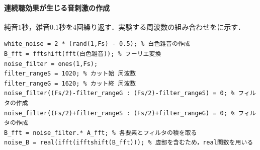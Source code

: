 \paragraph{連続聴効果が生じる音刺激の作成}純音\(1\)秒，雑音\(0.1\)秒を4回繰り返す．実験する周波数の組み合わせをに示す．
\begin{lstlisting}[caption={白色雑音の作成},label={src:白色雑音の作成}]
white_noise = 2 * (rand(1,Fs) - 0.5); % 白色雑音の作成
B_fft = fftshift(fft(白色雑音)); % フーリエ変換
noise_filter = ones(1,Fs);
filter_rangeS = 1020; % カット始 周波数
filter_rangeG = 1620; % カット終 周波数
noise_filter((Fs/2)-filter_rangeG : (Fs/2)-filter_rangeS) = 0; % フィルタの作成
noise_filter((Fs/2)+filter_rangeS : (Fs/2)+filter_rangeG) = 0; % フィルタの作成
B_fft = noise_filter.* A_fft; % 各要素とフィルタの積を取る
noise_B = real(ifft(ifftshift(B_fft))); % 虚部を含むため，real関数を用いる
\end{lstlisting}
